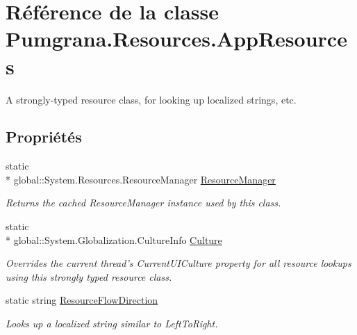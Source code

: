 \hypertarget{class_pumgrana_1_1_resources_1_1_app_resources}{\section{Référence de la classe Pumgrana.\+Resources.\+App\+Resources}
\label{class_pumgrana_1_1_resources_1_1_app_resources}
}


A strongly-\/typed resource class, for looking up localized strings, etc.  


\subsection*{Propriétés}
\begin{DoxyCompactItemize}
\item 
static \\*
global\+::\+System.\+Resources.\+Resource\+Manager \hyperlink{class_pumgrana_1_1_resources_1_1_app_resources_a91d03405933ec60ad0240a65af69f13d}{Resource\+Manager}
\begin{DoxyCompactList}\small\item\em Returns the cached Resource\+Manager instance used by this class. \end{DoxyCompactList}\item 
static \\*
global\+::\+System.\+Globalization.\+Culture\+Info \hyperlink{class_pumgrana_1_1_resources_1_1_app_resources_ad9f4f15fa905a17f7e7e33fa224ee82b}{Culture}
\begin{DoxyCompactList}\small\item\em Overrides the current thread's Current\+U\+I\+Culture property for all resource lookups using this strongly typed resource class. \end{DoxyCompactList}\item 
static string \hyperlink{class_pumgrana_1_1_resources_1_1_app_resources_ad2f389bab418744c24ef286d310b5fe4}{Resource\+Flow\+Direction}
\begin{DoxyCompactList}\small\item\em Looks up a localized string similar to Left\+To\+Right. \end{DoxyCompactList}\item 

\end{DoxyCompactItemize}
